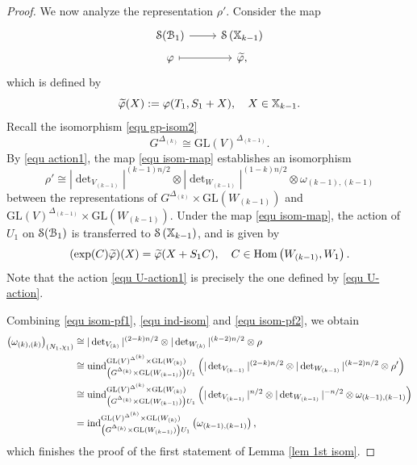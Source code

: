 \documentclass[11pt,reqno]{amsart}
\renewcommand{\1}{{\mathbf{1}}} \newcommand{\sB}{{\mathscr{B}}}
\newcommand{\CS}{{\mathcal {S}}} \newcommand{\CT}{{\mathcal {T}}}
\newcommand{\GL}{{\mathrm{GL}}}\newcommand{\G}{{\mathrm{G}}}
\theoremstyle{plain}
\theoremstyle{definition}
\numberwithin{equation}{section}
\begin{document}
\begin{proof}
We now analyze the representation $\rho'$.
Consider the map
 \begin{equation}\label{equ isom-map}\begin{tikzcd}[row sep=0.1cm]
	\CS(\CB_1)& \CS\left(\BX_{k-1}\right)\\
	\varphi & \wt{\varphi},
	\arrow[ from=1-1, to=1-2]
	\arrow[maps to, from=2-1, to=2-2]
\end{tikzcd}\end{equation} which is defined by
$$\widetilde{\varphi}(X):=\varphi(T_1,S_1+X),\quad X\in{\mathbb {X}}_{k-1}.$$
Recall the isomorphism \eqref{equ gp-isom2} $$G^{\Delta_{(k)}}\cong\GL(V)^{\Delta_{(k-1)}}.$$
By \eqref{equ action1}, the map \eqref{equ isom-map} establishes an isomorphism  
\begin{equation}\label{equ isom-pf2}\rho'\cong|\det\nolimits_{V_{(k-1)}}|^{(k-1)n/2}\otimes|\det\nolimits_{W_{(k-1)}}|^{(1-k)n/2}\otimes\omega_{(k-1),(k-1)}\end{equation} between the representations of $G^{\Delta_{(k)}}\times\GL(W_{(k-1)})$ and  $\GL(V)^{\Delta_{(k-1)}}\times\GL(W_{(k-1)})$.
Under the map \eqref{equ isom-map},
the action of $U_1$ on $\CS(\CB_1)$ is transferred to $\CS\left(\BX_{k-1}\right)$, and is given by
\begin{equation}\label{equ U-action1}(\exp(C)\widetilde{\varphi})(X)=\widetilde{\varphi}(X+S_1C),\quad C\in{\mathrm{Hom}}\left(W_{(k-1)},W_1\right).\end{equation}
Note that the action \eqref{equ U-action1} is precisely the one defined by \eqref{equ U-action}.

Combining \eqref{equ isom-pf1}, \eqref{equ ind-isom} and \eqref{equ isom-pf2}, we obtain 
$$\begin{aligned}\left(\omega_{(k),(k)}\right)_{\left(N_{1},\chi_1\right)}&\cong |\det\nolimits_{V_{(k)}}|^{(2-k)n/2}\otimes|\det\nolimits_{W_{(k)}}|^{(k-2)n/2}\otimes\rho\\
&\cong\mathrm{uind}_{\left(G^{\Delta_{(k)}}\times\GL(W_{(k-1)})\right)U_1}^{\GL(V)^{\Delta^{(k)}}\times\GL(W_{(k)})}\left(|\det\nolimits_{V_{(k-1)}}|^{(2-k)n/2}\otimes|\det\nolimits_{W_{(k-1)}}|^{(k-2)n/2}\otimes\rho'\right)\\
&\cong\mathrm{uind}_{\left(G^{\Delta_{(k)}}\times\GL(W_{(k-1)})\right)U_1}^{\GL(V)^{\Delta^{(k)}}\times\GL(W_{(k)})}\left(|\det\nolimits_{V_{(k-1)}}|^{n/2}\otimes|\det\nolimits_{W_{(k-1)}}|^{-n/2}\otimes\omega_{(k-1),(k-1)}\right)\\
&=\ind_{\left(G^{\Delta_{(k)}}\times\GL(W_{(k-1)})\right)U_1}^{\GL(V)^{\Delta^{(k)}}\times\GL(W_{(k)})}\left(\omega_{(k-1),(k-1)}\right),
\end{aligned}$$
which finishes the proof of the first statement of Lemma \ref{lem 1st isom}.




\end{proof}
\end{document}
